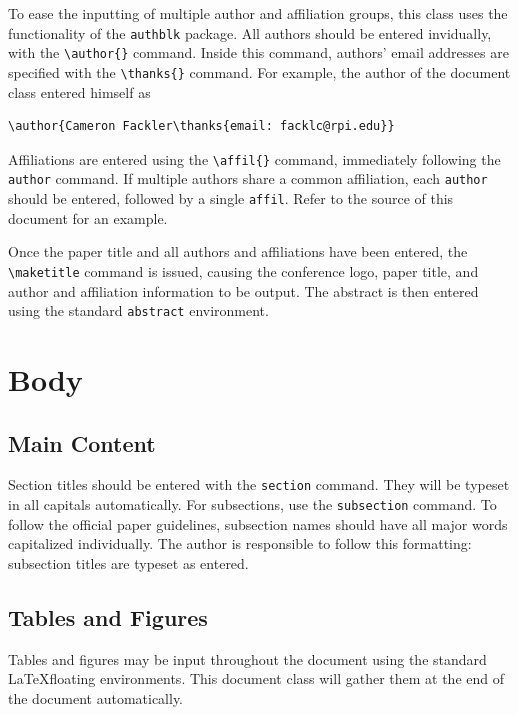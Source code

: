 \documentclass{internoise2012}
\begin{document}
To ease the inputting of multiple author and affiliation groups, this
class uses the functionality of the \texttt{authblk} package. All
authors should be entered invidually, with the
\texttt{\textbackslash{}author\{\}} command. Inside this command,
authors' email addresses are specified with the
\texttt{\textbackslash{}thanks\{\}} command. For example, the author
of the document class entered himself as
\begin{verbatim}
\author{Cameron Fackler\thanks{email: facklc@rpi.edu}}
\end{verbatim}

Affiliations are entered using the \texttt{\textbackslash{}affil\{\}}
command, immediately following the \texttt{author} command. If
multiple authors share a common affiliation, each \texttt{author}
should be entered, followed by a single \texttt{affil}. Refer to the
source of this document for an example.

Once the paper title and all authors and affiliations have been
entered, the \texttt{\textbackslash{}maketitle} command is issued,
causing the conference logo, paper title, and author and affiliation
information to be output. The abstract is then entered using the
standard \texttt{abstract} environment.

\section{Body}

\subsection{Main Content}

Section titles should be entered with the \texttt{section}
command. They will be typeset in all capitals automatically. For
subsections, use the \texttt{subsection} command. To follow the
official paper guidelines, subsection names should have all major
words capitalized individually. The author is responsible to follow
this formatting: subsection titles are typeset as entered.

\subsection{Tables and Figures}

Tables and figures may be input throughout the document using the
standard \LaTeX floating environments. This document class will gather
them at the end of the document automatically.
\end{document}

